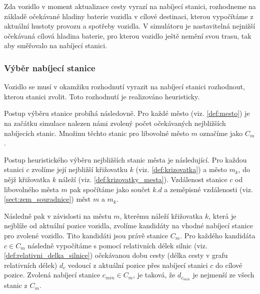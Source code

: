 Zda vozidlo v moment aktualizace cesty vyrazí na nabíjecí stanici, rozhodneme
na základě očekávané hladiny baterie vozidla v cílové destinaci, kterou vypočítáme
z aktuální hustoty provozu a spotřeby vozidla. V simulátoru je nastavitelná 
nejnižší očekávaná cílová hladina baterie, pro kterou vozidlo ještě nemění svou trasu,
tak aby směřovalo na nabíjecí stanici.


\subsubsection{Výběr nabíjecí stanice}

Vozidlo se musí v okamžiku rozhodnutí vyrazit na nabíjecí stanici rozhodnout,
kterou stanici zvolit. Toto rozhodnutí je realizováno heuristicky. 

Postup výběru stanice probíhá následovně. Pro každé město (viz. \cref{def:mesto})
je na začátku simulace nalezen námi zvolený počet očekávaných nejbližších 
nabíjecích stanic. Množinu těchto stanic pro libovolné město $m$ označíme 
jako $C_m$. 

Postup heuristického výběru nejbližších stanic města je následující. Pro každou stanici
$c$ zvolíme její nejbližší křižovatku $k$ (viz. \cref{def:krizovatka}) a město $m_k$,
do nějž křižovatka $k$ náleží (viz. \cref{def:krizovatky_mesta}). 
Vzdálenost stanice $c$ od libovolného města $m$ pak spočítáme jako součet $k.d$ a
zeměpisné vzdálenosti (viz. \cref{sect:zem_souradnice}) měst $m$ a $m_k$.

Následně pak v závislosti na městu $m$, kterému náleží křižovatka $k$,
která je nejblíže od aktuální pozice vozidla, zvolíme kandidáty na vhodné 
nabíjecí stanice pro zvolené vozidlo. Tito kandidáti jsou právě stanice 
$C_m$. Pro každého kandidáta $c \in C_m$ následně vypočítáme s pomocí relativních délek 
silnic (viz. \cref{def:relativni_delka_silnice}) očekávanou dobu cesty 
(délka cesty v grafu relativních délek) $d_c$ vedoucí z aktuální pozice přes
nabíjecí stanici $c$ do cílové pozice.
Zvolená nabíjecí stanice $c_{min} \in C_m$, je taková, 
že $d_{c_{min}}$ je nejmenší ze všech stanic z $C_m$.


